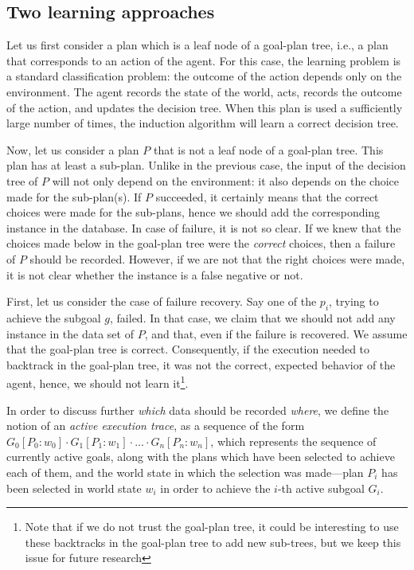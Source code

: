 \documentclass{article}
\begin{document}
\subsection{Two learning approaches}

Let us first consider a plan which is a leaf node of a goal-plan tree,
i.e., a plan that corresponds to an action of the agent. For this
case, the learning problem is a standard classification problem: the
outcome of the action depends only on the environment.  The agent
records the state of the world, acts, records the outcome of the
action, and updates the decision tree. When this plan is used a
sufficiently large number of times, the induction algorithm will learn
a correct decision tree.

Now, let us consider a plan $P$ that is not a leaf node of a goal-plan
tree. This plan has at least a sub-plan. Unlike in the previous case,
the input of the decision tree of $P$ will not only depend on the
environment: it also depends on the choice made for the
sub-plan(s). If $P$ succeeded, it certainly means that the correct
choices were made for the sub-plans, hence we should add the
corresponding instance in the database. In case of failure, it is not
so clear. If we knew that the choices made below in the goal-plan tree
were the \emph{correct} choices, then a failure of $P$ should be
recorded. However, if we are not that the right choices were made, it
is not clear whether the instance is a false negative or not.

First, let us consider the case of failure recovery. Say one of the
$p_i$, trying to achieve the subgoal $g$, failed.  In that case, we
claim that we should not add any instance in the data set of $P$, and
that, even if the failure is recovered.  We assume that the goal-plan
tree is correct. Consequently, if the execution needed to backtrack in
the goal-plan tree, it was not the correct, expected behavior of the
agent, hence, we should not learn it\footnote{Note that if we do not
  trust the goal-plan tree, it could be interesting to use these
  backtracks in the goal-plan tree to add new sub-trees, but we keep
  this issue for future research}.


In order to discuss further \emph{which} data should be recorded
\emph{where}, we define the notion of an \textit{active execution
  trace}, as a sequence of the form $G_0[P_0:w_0] \cdot G_1[P_1:w_1]
\cdot \ldots \cdot G_n[P_n:w_n]$, which represents the sequence of
currently active goals, along with the plans which have been selected
to achieve each of them, and the world state in which the selection
was made---plan $P_i$ has been selected in world state $w_i$ in order
to achieve the $i$-th active subgoal $G_i$.
\end{document}
